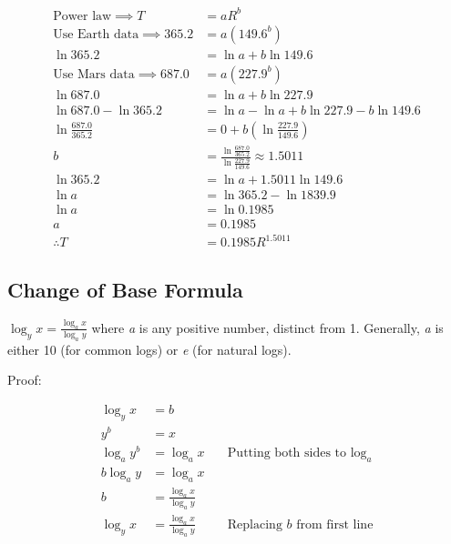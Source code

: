 \begin{align} \text{Power law}\implies T & = aR^b \\ \text{Use Earth data}\implies 365.2 & = a(149.6^b) \\ \ln 365.2 & = \ln a + b \ln 149.6 \\ \text{Use Mars data}\implies 687.0 & = a(227.9^b) \\ \ln 687.0 & = \ln a + b \ln 227.9 \\ \ln 687.0 - \ln 365.2 & = \ln a - \ln a + b\ln 227.9 - b\ln 149.6 \\ \ln \frac{687.0}{365.2} & = 0 + b(\ln\frac{227.9}{149.6}) \\ b & = \frac{\ln \tfrac{687.0}{365.2}}{\ln\tfrac{227.9}{149.6}} \approx 1.5011 \\ \ln 365.2 & = \ln a + 1.5011 \ln 149.6 \\ \ln a & = \ln 365.2 - \ln 1839.9 \\ \ln a & = \ln 0.1985 \\ a & = 0.1985 \\ \therefore T & = 0.1985R^{1.5011} \end{align}




\subsection{Change of Base Formula}
\label{sss:chan-dbc7}




$\log _{y}x=\frac{\log _{a}x} {\log _{a}y}$ where \textit{a} is any positive number,
distinct from 1. Generally, \textit{a} is either 10 (for common logs) or \textit{e} (for
natural logs).



Proof:

\begin{align} \log _{y}x & = b \\ y^b & = x \\ \log _{a}y^b & = \log _{a}x & \quad \text{Putting both sides to } \log _{a}\\ b\log _{a}y & = \log _{a}x \\ b & = \frac{\log _{a}x}{\log _{a}y} \\ \log _{y}x & = \frac{\log _{a}x}{\log _{a}y} & \quad \text{Replacing } b \text{ from first line} \end{align}




